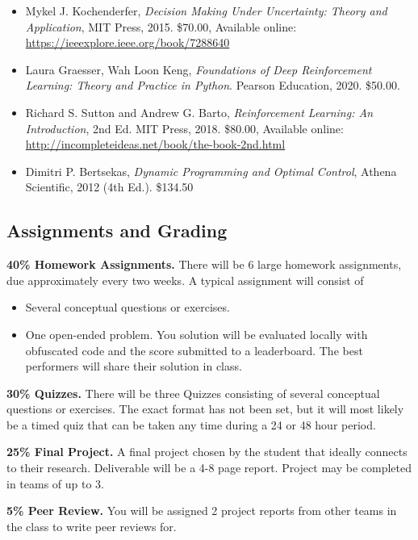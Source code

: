 \documentclass[9pt]{article}
\begin{document}
\begin{itemize}[noitemsep]
    \item Mykel J. Kochenderfer, \textit{Decision Making Under Uncertainty: Theory and Application}, MIT Press, 2015. \$70.00, Available online: \url{https://ieeexplore.ieee.org/book/7288640}
    \item Laura Graesser, Wah Loon Keng, \textit{Foundations of Deep Reinforcement Learning: Theory and Practice in Python}. Pearson Education, 2020. \$50.00.
    \item Richard S. Sutton and Andrew G. Barto, \textit{Reinforcement Learning: An Introduction}, 2nd Ed. MIT Press, 2018. \$80.00, Available online: \url{http://incompleteideas.net/book/the-book-2nd.html}
    \item Dimitri P. Bertsekas, \textit{Dynamic Programming and Optimal Control}, Athena Scientific, 2012 (4th Ed.). \$134.50
\end{itemize}


\begin{samepage}
\section*{Assignments and Grading}

\textbf{40\% Homework Assignments.}
There will be 6 large homework assignments, due approximately every two weeks. A typical assignment will consist of
\begin{itemize}[nosep]
    \item Several conceptual questions or exercises.
    \item One open-ended problem. You solution will be evaluated locally with obfuscated code and the score submitted to a leaderboard. The best performers will share their solution in class.
\end{itemize}

\textbf{30\% Quizzes.}
There will be three Quizzes consisting of several conceptual questions or exercises. The exact format has not been set, but it will most likely be a timed quiz that can be taken any time during a 24 or 48 hour period.

\textbf{25\% Final Project.}
A final project chosen by the student that ideally connects to their research. Deliverable will be a 4-8 page report. Project may be completed in teams of up to 3.

\textbf{5\% Peer Review.}
You will be assigned 2 project reports from other teams in the class to write peer reviews for.
\end{samepage}
\end{document}
